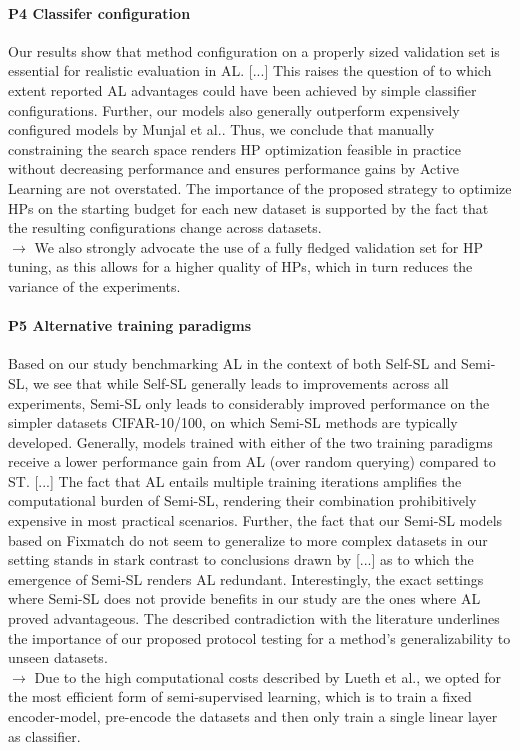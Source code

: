 \documentclass[]{article}
\begin{document}
\paragraph{P4 Classifer configuration} Our results show that method configuration on a properly sized validation
set is essential for realistic evaluation in AL. [...] This raises the question of to which extent reported
AL advantages could have been achieved by simple classifier configurations. Further, our models
also generally outperform expensively configured models by Munjal et al.. Thus, we conclude
that manually constraining the search space renders HP optimization feasible in practice without
decreasing performance and ensures performance gains by Active Learning are not overstated. The
importance of the proposed strategy to optimize HPs on the starting budget for each new dataset is
supported by the fact that the resulting configurations change across datasets.\\
$\rightarrow$ We also strongly advocate the use of a fully fledged validation set for HP tuning, as this allows for a higher quality of HPs, which in turn reduces the variance of the experiments.

\paragraph{P5 Alternative training paradigms} Based on our study benchmarking AL in the context of
both Self-SL and Semi-SL, we see that while Self-SL generally leads to improvements across all
experiments, Semi-SL only leads to considerably improved performance on the simpler datasets
CIFAR-10/100, on which Semi-SL methods are typically developed. Generally, models trained
with either of the two training paradigms receive a lower performance gain from AL (over random
querying) compared to ST. [...] The fact that AL entails multiple training iterations
amplifies the computational burden of Semi-SL, rendering their combination prohibitively expensive
in most practical scenarios. Further, the fact that our Semi-SL models based on Fixmatch do not seem
to generalize to more complex datasets in our setting stands in stark contrast to conclusions drawn by
[...] as to which the emergence of Semi-SL renders AL redundant. Interestingly, the exact settings
where Semi-SL does not provide benefits in our study are the ones where AL proved advantageous.
The described contradiction with the literature underlines the importance of our proposed protocol
testing for a method’s generalizability to unseen datasets. \\
$\rightarrow$ Due to the high computational costs described by Lueth et al., we opted for the most efficient form of semi-supervised learning, which is to train a fixed encoder-model, pre-encode the datasets and then only train a single linear layer as classifier.
\end{document}
